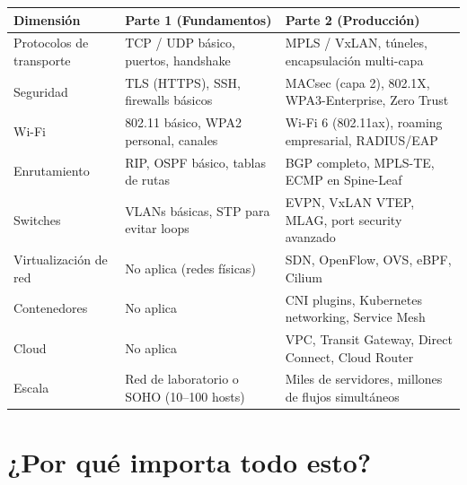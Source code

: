 \begin{center}
\renewcommand{\arraystretch}{1.4}
\begin{tabular}{p{3.8cm} p{4cm} p{4cm}}
\toprule
\textbf{Dimensión} & \textbf{Parte 1 (Fundamentos)} & \textbf{Parte 2 (Producción)} \\
\midrule
Protocolos de transporte
   & TCP / UDP básico, puertos, handshake
   & MPLS / VxLAN, túneles, encapsulación multi-capa \\
Seguridad
   & TLS (HTTPS), SSH, firewalls básicos
   & MACsec (capa 2), 802.1X, WPA3-Enterprise, Zero Trust \\
Wi-Fi
   & 802.11 básico, WPA2 personal, canales
   & Wi-Fi 6 (802.11ax), roaming empresarial, RADIUS/EAP \\
Enrutamiento
   & RIP, OSPF básico, tablas de rutas
   & BGP completo, MPLS-TE, ECMP en Spine-Leaf \\
Switches
   & VLANs básicas, STP para evitar loops
   & EVPN, VxLAN VTEP, MLAG, port security avanzado \\
Virtualización de red
   & No aplica (redes físicas)
   & SDN, OpenFlow, OVS, eBPF, Cilium \\
Contenedores
   & No aplica
   & CNI plugins, Kubernetes networking, Service Mesh \\
Cloud
   & No aplica
   & VPC, Transit Gateway, Direct Connect, Cloud Router \\
Escala
   & Red de laboratorio o SOHO (10--100 hosts)
   & Miles de servidores, millones de flujos simultáneos \\
\bottomrule
\end{tabular}
\end{center}

\section{ ¿Por qué importa todo esto?}

